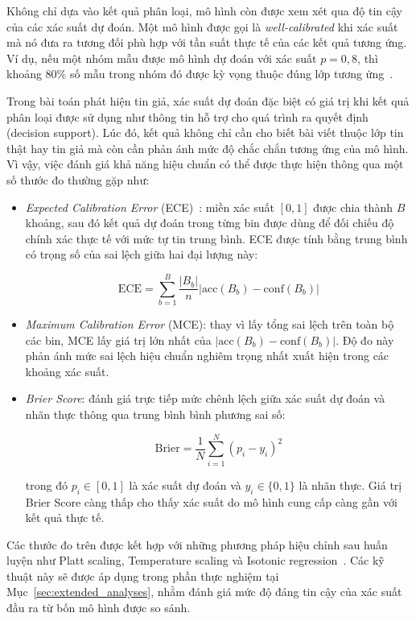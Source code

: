 Không chỉ dựa vào kết quả phân loại, mô hình còn được xem xét qua độ tin cậy của các xác suất dự đoán. Một mô hình được gọi là \textit{well-calibrated} khi xác suất mà nó đưa ra tương đối phù hợp với tần suất thực tế của các kết quả tương ứng. Ví dụ, nếu một nhóm mẫu được mô hình dự đoán với xác suất $p = 0{,}8$, thì khoảng 80\% số mẫu trong nhóm đó được kỳ vọng thuộc đúng lớp tương ứng~\cite{guo2017calibration}.

Trong bài toán phát hiện tin giả, xác suất dự đoán đặc biệt có giá trị khi kết quả phân loại được sử dụng như thông tin hỗ trợ cho quá trình ra quyết định (decision support). Lúc đó, kết quả không chỉ cần cho biết bài viết thuộc lớp tin thật hay tin giả mà còn cần phản ánh mức độ chắc chắn tương ứng của mô hình. Vì vậy, việc đánh giá khả năng hiệu chuẩn có thể được thực hiện thông qua một số thước đo thường gặp như:

\begin{itemize}[leftmargin=2em]

  \item \textit{Expected Calibration Error} (ECE)~\cite{naeini2015ece}: miền xác suất $[0, 1]$ được chia thành $B$ khoảng, sau đó kết quả dự đoán trong từng bin được dùng để đối chiếu độ chính xác thực tế với mức tự tin trung bình. ECE được tính bằng trung bình có trọng số của sai lệch giữa hai đại lượng này:

  \[
\mathrm{ECE} = \sum_{b=1}^{B} \frac{|B_b|}{n} \bigl| \mathrm{acc}(B_b) - \mathrm{conf}(B_b) \bigr|
\]

  \item \textit{Maximum Calibration Error} (MCE): thay vì lấy tổng sai lệch trên toàn bộ các bin, MCE lấy giá trị lớn nhất của $\bigl| \mathrm{acc}(B_b) - \mathrm{conf}(B_b) \bigr|$. Độ đo này phản ánh mức sai lệch hiệu chuẩn nghiêm trọng nhất xuất hiện trong các khoảng xác suất.

  \item \textit{Brier Score}: đánh giá trực tiếp mức chênh lệch giữa xác suất dự đoán và nhãn thực thông qua trung bình bình phương sai số:

  \[
\mathrm{Brier} = \frac{1}{N}\sum_{i=1}^{N}(p_i - y_i)^2
\]

    trong đó $p_i \in [0,1]$ là xác suất dự đoán và $y_i \in \{0,1\}$ là nhãn thực. Giá trị Brier Score càng thấp cho thấy xác suất do mô hình cung cấp càng gần với kết quả thực tế.

\end{itemize}

Các thước đo trên được kết hợp với những phương pháp hiệu chỉnh sau huấn luyện như Platt scaling, Temperature scaling và Isotonic regression~\cite{guo2017calibration}. Các kỹ thuật này sẽ được áp dụng trong phần thực nghiệm tại Mục~\ref{sec:extended_analyses}, nhằm đánh giá mức độ đáng tin cậy của xác suất đầu ra từ bốn mô hình được so sánh.



